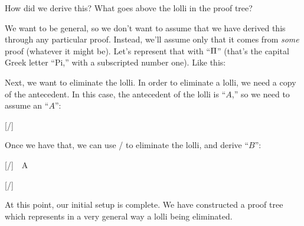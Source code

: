 \documentclass[../../../main.tex]{subfiles}
\begin{document}
\begin{prooftree*}
  \hypo{}
  \ellipsis{}{}
\end{prooftree*}

\noindent
How did we derive this? What goes above the lolli in the proof tree? 

\begin{prooftree*}
  \ellipsis{}{}
\end{prooftree*}

\noindent
We want to be general, so we don't want to assume that we have derived this through any particular proof. Instead, we'll assume only that it comes from \emph{some} proof (whatever it might be). Let's represent that with ``$\Proof/$'' (that's the capital Greek letter ``Pi,'' with a subscripted number one). Like this:

\begin{prooftree*}
  \hypo{\fbox{$\Proof/$}}
  \ellipsis{}{}
\end{prooftree*}

\noindent
Next, we want to eliminate the lolli. In order to eliminate a lolli, we need a copy of the antecedent. In this case, the antecedent of the lolli is ``$A$,'' so we need to assume an ``$A$'':

\begin{prooftree*}
  \hypo{\Proof/}
  \ellipsis{}{}
  
  \hypo{}
  [\startrule/]{~~~~}
  
\end{prooftree*}

\noindent
Once we have that, we can use \lolliElim/ to eliminate the lolli, and derive ``$B$'':

\begin{prooftree*}
  \hypo{\Proof/}
  \ellipsis{}{}
  
  \hypo{}
  [\startrule/]{~~A~~}
  
  [\lolliElim/]{}
\end{prooftree*}

\noindent
At this point, our initial setup is complete. We have constructed a proof tree which represents in a very general way a lolli being eliminated.


\end{document}
